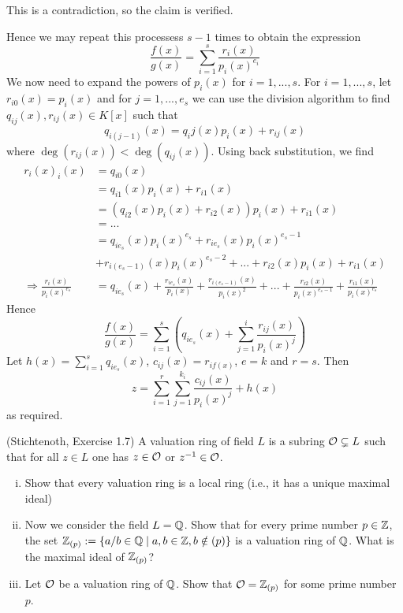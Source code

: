 \begin{solution}
\begin{enumerate}[(i)]
		This is a contradiction, so the claim is verified. 

		Hence we may 
		repeat this processess $s-1$ times to obtain the expression
		$$\frac{f(x)}{g(x)} = \sum^s_{i=1}\frac{r_i(x)}{p_i(x)^{e_i}}$$ 
		We now need to expand the powers of $p_i(x)$ for $i=1,...,s$. 
		For $i=1,...,s$, let $r_{i0}(x) = p_i(x)$  and for $j=1,...,e_s$ 
		we can use the division algorithm to find $q_{ij}(x),r_{ij}(x) \in K[x]$ 
		such that $$q_{i(j-1)}(x) = q_ij(x)p_i(x) + r_{ij}(x)$$ where $\deg(r_{ij}(x)) < \deg(q_{ij}(x))$.
		Using back substitution, we find 
		\begin{align*}
			r_i(x)_i(x) &= q_{i0}(x) \\
			&= q_{i1}(x)p_i(x) + r_{i1}(x) \\
			&= (q_{i2}(x)p_i(x)+r_{i2}(x))p_i(x) + r_{i1}(x) \\
			&= ... \\
			&= q_{ie_{s}}(x)p_i(x)^{e_s} + r_{ie_{s}}(x)p_i(x)^{e_s -1} \\
			&+ r_{i(e_s -1)}(x)p_i(x)^{e_s -2} + ... + r_{i2}(x)p_i(x) + r_{i1}(x) \\
			\Longrightarrow \frac{r_i(x)}{p_i(x)^{e_s}} &= q_{ie_s}(x) + 
			\frac{r_{ie_s}(x)}{p_i(x)}+ \frac{r_{i(e_s -1)}(x)}{p_i(x)^2} + 
			...+ \frac{r_{i2}(x)}{p_i(x)^{e_s - 1}} + \frac{r_{i1}(x)}{p_i(x)^{e_s}}
		\end{align*}
		Hence $$\frac{f(x)}{g(x)} = \sum^s_{i=1}(q_{ie_s}(x) + \sum^i_{j=1}  \frac{r_{ij}(x)}{p_i(x)^j})$$
		Let $h(x) = \sum^s_{i=1}q_{ie_s}(x)$, $c_{ij}(x)=r_{if(x)}$, $e=k$ and $r = s$. Then 
		$$z = \sum^r_{i = 1} \sum^{k_i}_{j=1} \frac{c_{ij}(x)}{p_i(x)^j} + h(x)$$ as required.
	\end{enumerate}
\end{solution}

\begin{exercise}(Stichtenoth, Exercise 1.7)
		A valuation ring of  field $L$ is a subring $\mathcal{O} \subsetneq L$ 
		such that for all $z \in L$ one has $z \in \mathcal{O}$ or $z^{-1} \in \mathcal{O}$.
		\begin{enumerate}[(i)]
			\item Show that every valuation ring is a local ring 
			(i.e., it has a unique maximal ideal)
			\item Now we consider the field $L = \mathbb{Q}$. Show that for every 
			prime number $p\in \mathbb{Z}$, the set 
			$\mathbb{Z}_{(p)} := \lbrace a/b \in \mathbb{Q} \mid a,b \in \mathbb{Z} , b \notin (p) \rbrace $ 
			is a valuation ring of $\mathbb{Q}$. What is the maximal ideal of $\mathbb{Z}_{(p)}$?  
			\item Let $\mathcal{O}$ be a valuation ring of $\mathbb{Q}$. 
			Show that $\mathcal{O} = \mathbb{Z}_{(p)}$ for some prime number $p$.
	\end{enumerate}
\end{exercise}

